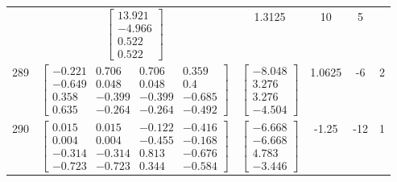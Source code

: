 \documentclass[a4paper,12pt]{article}
\begin{document}
\begin{tabular}{c c c c c c}
&
$\begin{bmatrix} 13.921 \\ -4.966 \\ 0.522 \\ 0.522 \end{bmatrix}$
&
1.3125
&
10
&
5
\\
289
&
$\begin{bmatrix} -0.221 & 0.706 & 0.706 & 0.359 \\ -0.649 & 0.048 & 0.048 & 0.4 \\ 0.358 & -0.399 & -0.399 & -0.685 \\ 0.635 & -0.264 & -0.264 & -0.492 \end{bmatrix}$
&
$\begin{bmatrix} -8.048 \\ 3.276 \\ 3.276 \\ -4.504 \end{bmatrix}$
&
1.0625
&
-6
&
2
\\
290
&
$\begin{bmatrix} 0.015 & 0.015 & -0.122 & -0.416 \\ 0.004 & 0.004 & -0.455 & -0.168 \\ -0.314 & -0.314 & 0.813 & -0.676 \\ -0.723 & -0.723 & 0.344 & -0.584 \end{bmatrix}$
&
$\begin{bmatrix} -6.668 \\ -6.668 \\ 4.783 \\ -3.446 \end{bmatrix}$
&
-1.25
&
-12
&
1
\\
\end{tabular} \egroup \newpage
\end{document}
